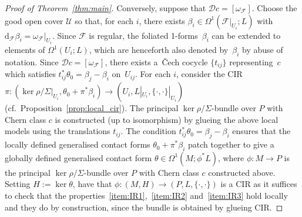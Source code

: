 \documentclass[pdftex]{sigma}
\numberwithin{equation}{section}
\newcommand{\de}{\mathrm{d}} %
\newcommand{\JM}{(P,L,\{\cdot,\cdot\})} %
\newcommand{\CM}{(M,H)} %
\begin{document}
\begin{proof}[Proof of Theorem~\ref{thm:main}]
Conversely, suppose that $\mathcal{D}c = [\omega_{\mathcal{F}}]$. Choose the good open cover $\mathcal{U}$ so that, for each $i$, there exists $\beta_i \in \Omega^1(\mathcal{F}|_{U_i};L)$ with $\de_{\mathcal{F}}\beta_i = \omega_{\mathcal{F}}|_{U_i}$. Since $\mathcal{F}$ is regular, the foliated 1-forms~$\beta_i$ can be extended to elements of $\Omega^1(U_i;L)$, which are henceforth also denoted by~$\beta_i$ by abuse of notation. Since $\mathcal{D}c = [\omega_{\mathcal{F}}]$, there exists a~\v{C}ech cocycle $\{t_{ij}\}$ representing~$c$ which satisf\/ies $t_{ij}^* \theta_0 = \beta_j - \beta_i$ on~$U_{ij}$. For each $i$, consider the CIR $\pi \colon (\ker \rho/\Sigma|_{U_i},\theta_0 + \pi^*\beta_i) \to (U_i,L|_{U_i}, \{\cdot,\cdot\}|_{U_i})$ (cf.\ Proposition~\ref{prop:local_cir}). The principal $\ker \rho/\Sigma$-bundle over $P$ with Chern class $c$ is constructed (up to isomorphism) by glueing the above local models using the translations $t_{ij}$. The condition $t_{ij}^* \theta_0 = \beta_j - \beta_i$ ensures that the locally def\/ined generalised contact forms $\theta_0 + \pi^*\beta_i$ patch together to give a globally def\/ined generalised contact form $\theta \in \Omega^1(M;\phi^* L)$, where $\phi \colon M \to P$ is the principal $\ker \rho/\Sigma$-bundle over $P$ with Chern class $c$ constructed above. Setting $H := \ker \theta$, have that $\phi\colon \CM \to \JM$ is a CIR as it suf\/f\/ices to check that the properties~\ref{item:IR1},~\ref{item:IR2} and~\ref{item:IR3} hold locally and they do by construction, since the bundle is obtained by glueing CIR.


\end{proof}
\end{document}
